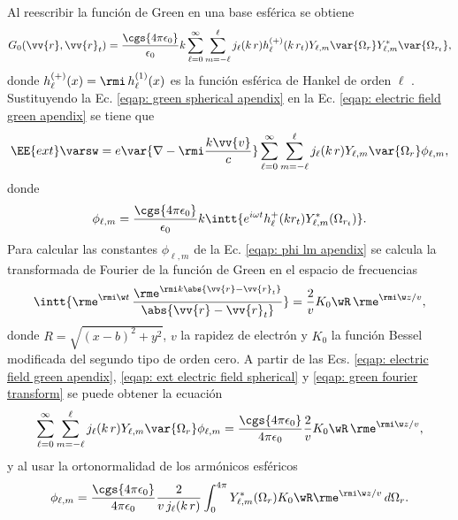 Al reescribir la función de Green en una base esférica se obtiene \cite{de1999relativistic}
\begin{equation}
G_0(\vv{r},\vv{r}_t)=\frac{\cgs{4\pi\epsilon_0}}{\epsilon_0} k \sum_{\ell=0}^{\infty}\sum_{m=-\ell}^{\ell} j_{\ell}(k \, r) h_{\ell}^{(+)}(k \, r_t) Y_{\ell,m}\var{\Omega_r} Y_{\ell, m}^{*}\var{\Omega_{r_t}}, \label{eqap: green spherical apendix}
\end{equation}
donde $h_{\ell}^{(+)}(x)= \rmi \, h_{\ell}^{(1)}(x)$ es la función esférica de Hankel de orden $\ell$ \cite{Abramowitz}. Sustituyendo la Ec. \eqref{eqap: green spherical apendix} en la Ec. \eqref{eqap: electric field green apendix} se tiene que 
\begin{equation}
\EE{ext}\varsw = e\var{\nabla-\rmi \frac{k\vv{v}}{c}} \sum_{\ell=0}^{\infty}\sum_{m=-\ell}^{\ell} j_{\ell}(k \, r) Y_{\ell,m}\var{\Omega_r} \phi_{\ell, m},
\label{eqap: ext electric field spherical}
\end{equation}
donde 
\begin{equation}
\phi_{\ell, m} = \frac{\cgs{4\pi\epsilon_0}}{\epsilon_0} k \intt{e^{i \omega t} h_{\ell}^{+}(k r_{t}) Y_{\ell, m}^{*}(\Omega_{r_t}) }.
\label{eqap: phi lm apendix}
\end{equation}
Para calcular las constantes $\phi_{\ell, m}$ de la Ec. \eqref{eqap: phi lm apendix} se calcula la transformada de Fourier de la función de Green en el espacio de frecuencias \cite{maciel2019electromagnetic}
\begin{equation}
\intt{\rme^{\rmi \w t} \,\frac{\rme^{\rmi k \abs{\vv{r}-\vv{r}_t}}}{\abs{\vv{r}-\vv{r}_t}}} = \frac{2}{v} K_0\wR \, \rme^{\rmi \w z/v},
\label{eqap: green fourier transform}
\end{equation}
donde $R = \sqrt{(x-b)^2+y^2}$, $v$ la rapidez de electrón y $K_0$ la función Bessel modificada del segundo tipo de orden cero. A partir de las Ecs. \eqref{eqap: electric field green apendix}, \eqref{eqap: ext electric field spherical} y \eqref{eqap: green fourier transform} se puede obtener la ecuación
\begin{equation}
\sum_{\ell=0}^{\infty}\sum_{m=-\ell}^{\ell} j_{\ell}(k \, r) Y_{\ell,m}\var{\Omega_r} \phi_{\ell, m} = \frac{\cgs{4\pi\epsilon_0}}{4\pi\epsilon_0}\frac{2}{v} K_0\wR \, \rme^{\rmi \w z/v},
\end{equation}
y al usar la ortonormalidad de los armónicos esféricos
\begin{equation}
\phi_{\ell,m} = \frac{\cgs{4\pi\epsilon_0}}{4\pi\epsilon_0}\frac{2}{v \,j_{\ell}(k\,r)} \int_{0}^{4\pi} Y_{\ell,m}^{*}(\Omega_r) K_0\wR \rme^{\rmi \w z /v} \, d\Omega_{r}.
\label{eq: appendix coeffs phi l m}
\end{equation}
